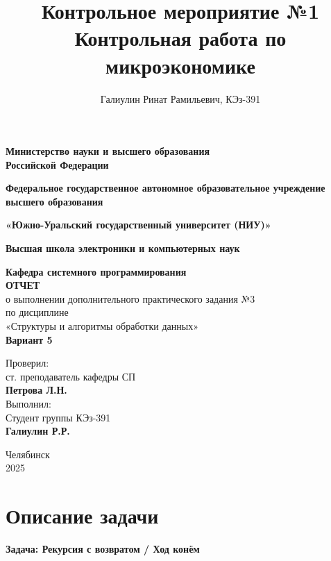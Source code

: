 \documentclass[a4paper,12pt]{article}
\title{\textbf{Контрольное мероприятие №1} \\
	Контрольная работа по микроэкономике }
\author{Галиулин Ринат Рамильевич, КЭз-391}
\date{}
\begin{document}
	\begin{titlepage}
		\begin{center}
			{\large \textbf{Министерство науки и высшего образования \\ Российской Федерации}}
			
			{\large\textbf{Федеральное государственное автономное образовательное учреждение высшего образования}}
			
			{\large \textbf{«Южно-Уральский государственный университет (НИУ)»}}
			
			{\large \textbf{Высшая школа электроники и компьютерных наук}}
			
			{\large \textbf{Кафедра системного программирования}\\[2cm]
			}
			\textbf{ОТЧЕТ}\\[0.2cm]
			о выполнении дополнительного практического задания №3\\[0.2cm]
			по дисциплине\\[0.2cm]
			«Структуры и алгоритмы обработки данных»\\[0.2cm]
			\textbf{Вариант 5}\\[3cm]
		\end{center}
		
		\begin{flushright}
			Проверил:\\[0.2cm]
			ст. преподаватель кафедры СП\\[0.2cm]
			\textbf{Петрова Л.Н.}\\[1cm]
						
			Выполнил:\\[0.2cm]
			Студент группы КЭз-391\\[0.2cm]
			\textbf{Галиулин Р.Р.}\\[0.2cm]
			
		\end{flushright}
		\vfill{}
		
		\begin{center}
			Челябинск \\ 2025
		\end{center}
	\end{titlepage}
	\newpage
	
	\tableofcontents
	
	\setcounter{page}{2}
	\newpage
	\section{Описание задачи}
	\textbf{Задача: Рекурсия с возвратом / Ход конём}
	
\end{document}
